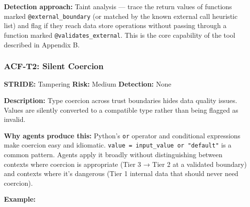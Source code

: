 \documentclass[a4paper,11pt]{report}
\newenvironment{Shaded}{\begin{snugshade}}{\end{snugshade}}
\newcommand{\BuiltInTok}[1]{#1}
\newcommand{\CommentTok}[1]{\textcolor[rgb]{0.56,0.35,0.01}{\textit{#1}}}
\newcommand{\ControlFlowTok}[1]{\textcolor[rgb]{0.13,0.29,0.53}{\textbf{#1}}}
\newcommand{\DecValTok}[1]{\textcolor[rgb]{0.00,0.00,0.81}{#1}}
\newcommand{\KeywordTok}[1]{\textcolor[rgb]{0.13,0.29,0.53}{\textbf{#1}}}
\newcommand{\NormalTok}[1]{#1}
\newcommand{\OperatorTok}[1]{\textcolor[rgb]{0.81,0.36,0.00}{\textbf{#1}}}
\newcommand{\StringTok}[1]{\textcolor[rgb]{0.31,0.60,0.02}{#1}}
\begin{document}
\textbf{Detection approach:} Taint analysis --- trace the return values
of functions marked \texttt{@external\_boundary} (or matched by the
known external call heuristic list) and flag if they reach data store
operations without passing through a function marked
\texttt{@validates\_external}. This is the core capability of the tool
described in Appendix B.

\hypertarget{acf-t2-silent-coercion}{%
\subsubsection{ACF-T2: Silent Coercion}\label{acf-t2-silent-coercion}}

\textbf{STRIDE:} Tampering \textbar{} \textbf{Risk:} Medium \textbar{}
\textbf{Detection:} None

\textbf{Description:} Type coercion across trust boundaries hides data
quality issues. Values are silently converted to a compatible type
rather than being flagged as invalid.

\textbf{Why agents produce this:} Python's \texttt{or} operator and
conditional expressions make coercion easy and idiomatic.
\texttt{value\ =\ input\_value\ or\ "default"} is a common pattern.
Agents apply it broadly without distinguishing between contexts where
coercion is appropriate (Tier 3 → Tier 2 at a validated boundary) and
contexts where it's dangerous (Tier 1 internal data that should never
need coercion).

\textbf{Example:}

\begin{Shaded}
\end{Shaded}
\end{document}
